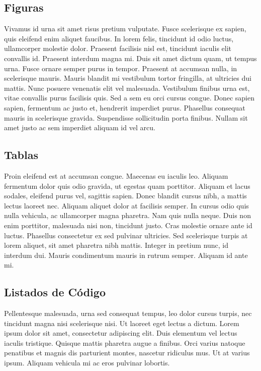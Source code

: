 \documentclass{article}
\begin{document}
\subsection{Figuras}

Vivamus id urna sit amet risus pretium vulputate. Fusce scelerisque ex sapien, quis eleifend enim aliquet faucibus. In lorem felis, tincidunt id odio luctus, ullamcorper molestie dolor. Praesent facilisis nisl est, tincidunt iaculis elit convallis id. Praesent interdum magna mi. Duis sit amet dictum quam, ut tempus urna. Fusce ornare semper purus in tempor. Praesent at accumsan nulla, in scelerisque mauris. Mauris blandit mi vestibulum tortor fringilla, at ultricies dui mattis. Nunc posuere venenatis elit vel malesuada. Vestibulum finibus urna est, vitae convallis purus facilisis quis. Sed a sem eu orci cursus congue. Donec sapien sapien, fermentum ac justo et, hendrerit imperdiet purus. Phasellus consequat mauris in scelerisque gravida. Suspendisse sollicitudin porta finibus. Nullam sit amet justo ac sem imperdiet aliquam id vel arcu.

\subsection{Tablas}

Proin eleifend est at accumsan congue. Maecenas eu iaculis leo. Aliquam fermentum dolor quis odio gravida, ut egestas quam porttitor. Aliquam et lacus sodales, eleifend purus vel, sagittis sapien. Donec blandit cursus nibh, a mattis lectus laoreet nec. Aliquam aliquet dolor at facilisis semper. In cursus odio quis nulla vehicula, ac ullamcorper magna pharetra. Nam quis nulla neque. Duis non enim porttitor, malesuada nisi non, tincidunt justo. Cras molestie ornare ante id luctus. Phasellus consectetur ex sed pulvinar ultricies. Sed scelerisque turpis at lorem aliquet, sit amet pharetra nibh mattis. Integer in pretium nunc, id interdum dui. Mauris condimentum mauris in rutrum semper. Aliquam id ante mi.

\subsection{Listados de Código}

Pellentesque malesuada, urna sed consequat tempus, leo dolor cursus turpis, nec tincidunt magna nisi scelerisque nisi. Ut laoreet eget lectus a dictum. Lorem ipsum dolor sit amet, consectetur adipiscing elit. Duis elementum vel lectus iaculis tristique. Quisque mattis pharetra augue a finibus. Orci varius natoque penatibus et magnis dis parturient montes, nascetur ridiculus mus. Ut at varius ipsum. Aliquam vehicula mi ac eros pulvinar lobortis.
\end{document}
